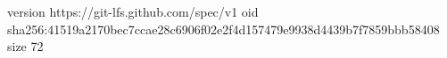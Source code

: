 version https://git-lfs.github.com/spec/v1
oid sha256:41519a2170bec7ccae28c6906f02e2f4d157479e9938d4439b7f7859bbb58408
size 72
